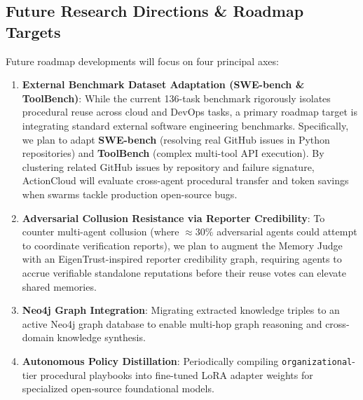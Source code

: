 \documentclass[lettersize,journal]{IEEEtran}
\begin{document}
\subsection{Future Research Directions \& Roadmap Targets}
Future roadmap developments will focus on four principal axes:
\begin{enumerate}
    \item \textbf{External Benchmark Dataset Adaptation (SWE-bench \& ToolBench)}: While the current 136-task benchmark rigorously isolates procedural reuse across cloud and DevOps tasks, a primary roadmap target is integrating standard external software engineering benchmarks. Specifically, we plan to adapt \textbf{SWE-bench} \cite{jimenez2024swebench} (resolving real GitHub issues in Python repositories) and \textbf{ToolBench} \cite{qin2024toolbench} (complex multi-tool API execution). By clustering related GitHub issues by repository and failure signature, ActionCloud will evaluate cross-agent procedural transfer and token savings when swarms tackle production open-source bugs.
    \item \textbf{Adversarial Collusion Resistance via Reporter Credibility}: To counter multi-agent collusion (where $\approx 30\%$ adversarial agents could attempt to coordinate verification reports), we plan to augment the Memory Judge with an EigenTrust-inspired reporter credibility graph, requiring agents to accrue verifiable standalone reputations before their reuse votes can elevate shared memories.
    \item \textbf{Neo4j Graph Integration}: Migrating extracted knowledge triples to an active Neo4j graph database to enable multi-hop graph reasoning and cross-domain knowledge synthesis.
    \item \textbf{Autonomous Policy Distillation}: Periodically compiling \texttt{organizational}-tier procedural playbooks into fine-tuned LoRA adapter weights for specialized open-source foundational models.
\end{enumerate}
\end{document}
